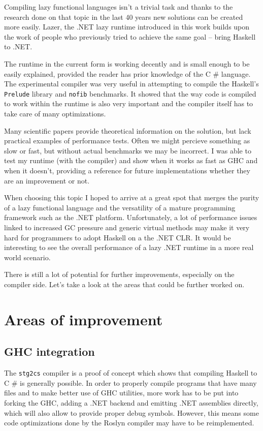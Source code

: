 \documentclass[en]{pracamgr}
\newcommand{\shrp}{%
  {\fontfamily{ppl}\selectfont\#%
  }}
\begin{document}
Compiling lazy functional languages isn't a trivial task
and thanks to the research done on that topic in the last 40 years
new solutions can be created more easily.
Lazer, the .NET lazy runtime introduced in this work builds upon
the work of people who previously tried to achieve the same goal --
bring Haskell to .NET.

The runtime in the current form is working decently and is small enough to be
easily explained, provided the reader has prior knowledge of the C\shrp{} language.
The experimental compiler was very useful in attempting to compile the
Haskell's \texttt{Prelude} library and \texttt{nofib} benchmarks.
It showed that the way code is compiled to work within the runtime is also very important
and the compiler itself has to take care of many optimizations.

Many scientific papers provide theoretical information on the solution,
but lack practical examples of performance tests.
Often we might percieve something as slow or fast, but without actual benchmarks
we may be incorrect.
I was able to test my runtime (with the compiler) and show when it works as fast as GHC and
when it doesn't, providing a reference for future implementations whether they are
an improvement or not.

When choosing this topic I hoped to arrive at a great spot that merges
the purity of a lazy functional language and the versatility of
a mature programming framework such as the .NET platform.
Unfortunately, a lot of performance issues linked to increased
GC pressure and generic virtual methods may make it very hard 
for programmers to adopt Haskell on a the .NET CLR.
It would be interesting to see the overall performance of a lazy .NET runtime
in a more real world scenario.

There is still a lot of potential for further improvements, especially on the compiler side.
Let's take a look at the areas that could be further worked on.

\section{Areas of improvement}
\subsection{GHC integration}
The \texttt{stg2cs} compiler is a proof of concept which shows that compiling Haskell
to C\shrp{} is generally possible. In order to properly compile programs that have many
files and to make better use of GHC utilities, more work has to be put into forking the GHC,
adding a .NET backend and emitting .NET assemblies directly,
which will also allow to provide proper debug symbols.
However, this means some code optimizations done by the Roslyn compiler
may have to be reimplemented.
\end{document}
